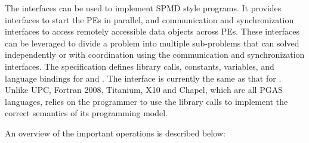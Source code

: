 

The \openshmem{} interfaces can be used to implement \ac{SPMD} style programs. It provides interfaces 
to start the \openshmem{} \ac{PE}s in parallel, and communication and synchronization interfaces to access remotely accessible data objects across \ac{PE}s. These interfaces can be leveraged to divide a problem into multiple sub-problems that can solved independently or with coordination using the communication and synchronization interfaces.
The \openshmem specification defines library calls, constants, variables, and language bindings for \Clang{} and \Fortran{}.
The \Cpp{} interface is currently the same as that for \Clang. Unlike UPC, Fortran 2008, Titanium, X10 and Chapel, which are all PGAS languages, \openshmem relies on 
the programmer to use the library calls  to implement the correct semantics of its programming model.

An overview of the important \openshmem operations is described below:

